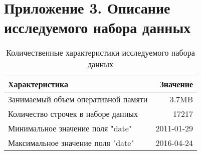 ﻿
\chapter{Приложение 3. Описание исследуемого набора данных}


\begin{table}
    \centering
    \begin{tabular}{|l|r|}
		\hline
			Характеристика	& Значение \\
		\hline
			Занимаемый объем оперативной памяти & 3.7MB      \\
			Количество строчек в наборе данных  & 17217      \\
			Минимальное значение поля "date"    & 2011-01-29 \\
			Максимальное значение поля "date"   & 2016-04-24 \\
		\hline
	\end{tabular}
	\caption{ Количественные характеристики исследуемого набора данных }
	\label{tbl:sales_dataset_description_quantitive}
\end{table}


